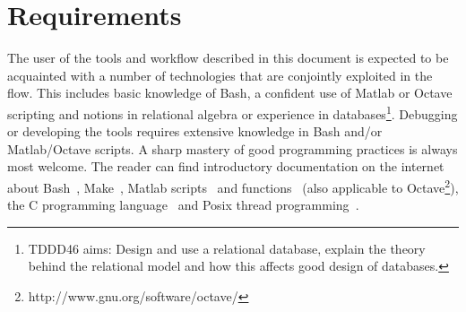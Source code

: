 
\section{Requirements}
The user of the tools and workflow described in this document is expected to be acquainted with a number of technologies that are conjointly exploited in the flow. This includes basic knowledge of Bash, a confident use of Matlab or Octave scripting and notions in relational algebra or experience in databases\footnote{TDDD46 aims: Design and use a relational database, explain the theory behind the relational model and how this affects good design of databases.}. Debugging or developing the tools requires extensive knowledge in Bash and/or Matlab/Octave scripts. A sharp mastery of good programming practices is always most welcome. The reader can find introductory documentation on the internet about Bash~\cite{mikeg00,garrels08}, Make~\cite{anonymous_make_1,gnu_make}, Matlab scripts~\cite{huber97} and functions~\cite{recktenw95} (also applicable to Octave\footnote{http://www.gnu.org/software/octave/}), the C programming language~\cite{cprogramming} and Posix thread programming~\cite{tim10,barney12}.

